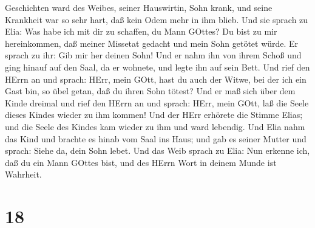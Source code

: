 Geschichten ward des Weibes, seiner Hauswirtin, Sohn krank, und seine
Krankheit war so sehr hart, daß kein Odem mehr in ihm blieb.
 Und sie sprach zu Elia: Was habe ich mit dir zu schaffen,
du Mann GOttes? Du bist zu mir hereinkommen, daß meiner Missetat gedacht
und mein Sohn getötet würde.  Er sprach zu ihr: Gib mir her
deinen Sohn! Und er nahm ihn von ihrem Schoß und ging hinauf auf den
Saal, da er wohnete, und legte ihn auf sein Bett.  Und rief
den HErrn an und sprach: HErr, mein GOtt, hast du auch der Witwe, bei
der ich ein Gast bin, so übel getan, daß du ihren Sohn tötest?
 Und er maß sich über dem Kinde dreimal und rief den HErrn
an und sprach: HErr, mein GOtt, laß die Seele dieses Kindes wieder zu
ihm kommen!  Und der HErr erhörete die Stimme Elias; und
die Seele des Kindes kam wieder zu ihm und ward lebendig. 
Und Elia nahm das Kind und brachte es hinab vom Saal ins Haus; und gab
es seiner Mutter und sprach: Siehe da, dein Sohn lebet. 
Und das Weib sprach zu Elia: Nun erkenne ich, daß du ein Mann GOttes
bist, und des HErrn Wort in deinem Munde ist Wahrheit.

\hypertarget{section-17}{%
\section{18}\label{section-17}}

